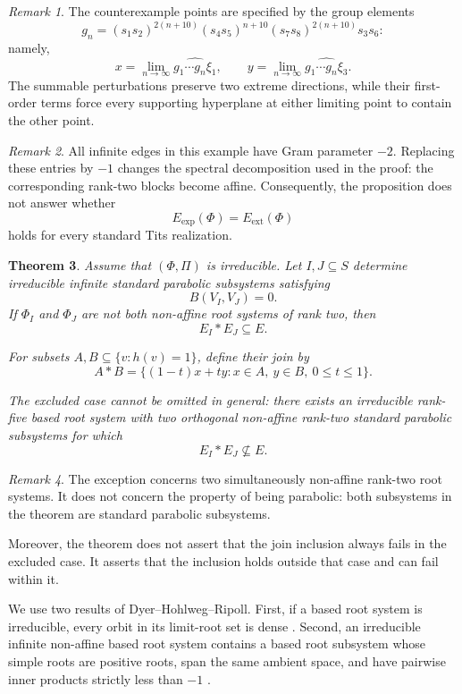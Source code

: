 \documentclass[11pt,reqno]{amsart}
\theoremstyle{plain}
\newtheorem{theorem}{Theorem}[section]
\theoremstyle{definition}
\theoremstyle{remark}
\newtheorem{remark}[theorem]{Remark}
\numberwithin{equation}{section}
\begin{document}
\begin{remark}
The counterexample points are specified by the group elements
\[
g_n=
(s_1s_2)^{2(n+10)}
(s_4s_5)^{n+10}
(s_7s_8)^{2(n+10)}
s_3s_6:
\]
namely,
\[
x=\lim_{n\to\infty}
\widehat{g_1\cdots g_n\xi_1},
\qquad
y=\lim_{n\to\infty}
\widehat{g_1\cdots g_n\xi_3}.
\]
The summable perturbations preserve two extreme directions,
while their first-order terms force every supporting hyperplane
at either limiting point to contain the other point.
\end{remark}

\begin{remark}
All infinite edges in this example have Gram parameter $-2$.
Replacing these entries by $-1$ changes the spectral
decomposition used in the proof: the corresponding rank-two
blocks become affine.
Consequently, the proposition does not answer whether
\[
E_{\mathrm{exp}}(\Phi)=E_{\mathrm{ext}}(\Phi)
\]
holds for every standard Tits realization.
\end{remark}
\begin{theorem}\label{thm:orthogonal-parabolic-join}
Assume that $(\Phi,\Pi)$ is irreducible. Let $I,J\subseteq S$
determine irreducible infinite standard parabolic subsystems
satisfying
\[
B(V_I,V_J)=0.
\]
If $\Phi_I$ and $\Phi_J$ are not both non-affine root systems of
rank two, then
\[
E_I*E_J\subseteq E.
\]

For subsets $A,B\subseteq\{v:h(v)=1\}$, define their join by
\[
A*B
=
\{(1-t)x+ty:x\in A,\ y\in B,\ 0\le t\le1\}.
\]

The excluded case cannot be omitted in general: there exists an
irreducible rank-five based root system with two orthogonal
non-affine rank-two standard parabolic subsystems for which
\[
E_I*E_J\not\subseteq E.
\]
\end{theorem}

\begin{remark}\label{rem:meaning-of-exception}
The exception concerns two simultaneously non-affine rank-two
root systems. It does not concern the property of being parabolic:
both subsystems in the theorem are standard parabolic subsystems.

Moreover, the theorem does not assert that the join inclusion
always fails in the excluded case. It asserts that the inclusion
holds outside that case and can fail within it.
\end{remark}

We use two results of Dyer--Hohlweg--Ripoll. First, if a based root
system is irreducible, every orbit in its limit-root set is dense
\cite[Theorem~3.1]{DHR}. Second, an irreducible infinite non-affine
based root system contains a based root subsystem whose simple
roots are positive roots, span the same ambient space, and have
pairwise inner products strictly less than $-1$
\cite[Proposition~6.4]{DHR}.
\end{document}
